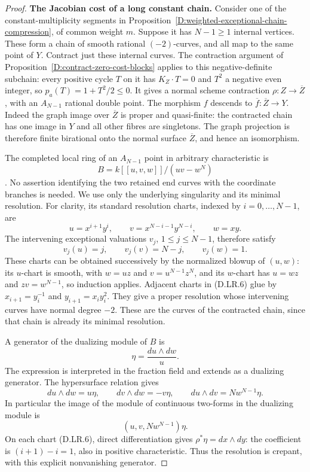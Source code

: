 \begin{proof}
\par\smallskip\noindent\textbf{The Jacobian cost of a long constant chain.}\quad
Consider one of the constant-multiplicity segments in
Proposition~\ref{D:weighted-exceptional-chain-compression}, of
common weight $m$.  Suppose it has $N-1\ge1$ internal vertices.
These form a chain of smooth rational $(-2)$-curves, and all map
to the same point of $Y$.  Contract just these internal curves.
The contraction argument of
Proposition~\ref{D:contract-zero-cost-blocks} applies to this
negative-definite subchain: every positive cycle $T$ on it has
$K_Z\cdot T=0$ and $T^2$ a negative even integer, so
$p_a(T)=1+T^2/2\le0$.  It gives a normal scheme contraction
$\rho:Z\to\overline Z$, with an $A_{N-1}$ rational double point.
The morphism $f$ descends to $\overline f:\overline Z\to Y$.
Indeed the graph image over $\overline Z$ is proper and
quasi-finite: the contracted chain has one image in $Y$ and all
other fibres are singletons.  The graph projection is therefore
finite birational onto the normal surface $\overline Z$, and
hence an isomorphism.

The completed local ring of an $A_{N-1}$ point in arbitrary
characteristic is
\[
                  B=k[[u,v,w]]/(uv-w^N)
\]
\citep[Theorem 0.4.13, printed p.~72, together with
Proposition 0.4.8]{C_Enriques2025}.
No assertion identifying the two retained end curves with the
coordinate branches is needed.  We use only the underlying
singularity and its minimal resolution.
For clarity, its standard resolution charts, indexed by
$i=0,\ldots,N-1$, are
\[
 u=x^{i+1}y^i,\qquad
 v=x^{N-i-1}y^{N-i},\qquad w=xy.
 \tag{D.LR.6}
\]
The intervening exceptional valuations $v_j$, $1\le j\le N-1$,
therefore satisfy
\[
                     v_j(u)=j,\qquad
                     v_j(v)=N-j,\qquad v_j(w)=1.        \tag{D.LR.7}
\]
These charts can be obtained successively by the normalized
blowup of $(u,w)$: its $u$-chart is smooth, with
$w=uz$ and $v=u^{N-1}z^N$, and its $w$-chart has
$u=wz$ and $zv=w^{N-1}$, so induction applies.
Adjacent charts in (D.LR.6) glue by
$x_{i+1}=y_i^{-1}$ and $y_{i+1}=x_i y_i^2$.
They give a proper resolution whose intervening curves have
normal degree $-2$.  These are the curves of the contracted
chain, since that chain is already its minimal resolution.

A generator of the dualizing module of $B$ is
\[
                         \eta=\frac{du\wedge dw}{u}.
\]
The expression is interpreted in the fraction field and extends
as a dualizing generator.  The hypersurface relation gives
\[
 du\wedge dw=u\eta,\qquad
 dv\wedge dw=-v\eta,\qquad
 du\wedge dv=Nw^{N-1}\eta.
\]
In particular the image of the module of continuous two-forms
in the dualizing module is
\[
                 (u,v,Nw^{N-1})\eta.                    \tag{D.LR.8}
\]
On each chart (D.LR.6), direct differentiation gives
$\rho^*\eta=dx\wedge dy$: the coefficient is
$(i+1)-i=1$, also in positive characteristic.  Thus the
resolution is crepant, with this explicit nonvanishing generator.


\end{proof}
